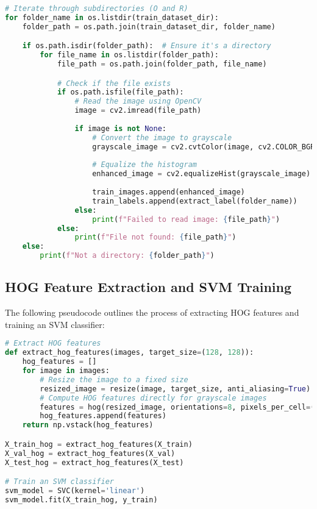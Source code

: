 \documentclass{article}
\begin{document}
\begin{lstlisting}[language=Python, caption=Data Loading and Processing Pseudocode]
# Iterate through subdirectories (O and R)
for folder_name in os.listdir(train_dataset_dir):
    folder_path = os.path.join(train_dataset_dir, folder_name)

    if os.path.isdir(folder_path):  # Ensure it's a directory
        for file_name in os.listdir(folder_path):
            file_path = os.path.join(folder_path, file_name)

            # Check if the file exists
            if os.path.isfile(file_path):
                # Read the image using OpenCV
                image = cv2.imread(file_path)
                
                if image is not None:
                    # Convert the image to grayscale
                    grayscale_image = cv2.cvtColor(image, cv2.COLOR_BGR2GRAY)
                    
                    # Equalize the histogram
                    enhanced_image = cv2.equalizeHist(grayscale_image)
                    
                    train_images.append(enhanced_image)
                    train_labels.append(extract_label(folder_name))
                else:
                    print(f"Failed to read image: {file_path}")
            else:
                print(f"File not found: {file_path}")
    else:
        print(f"Not a directory: {folder_path}")
\end{lstlisting}

\subsection{HOG Feature Extraction and SVM Training}
The following pseudocode outlines the process of extracting HOG features and training an SVM classifier:

\begin{lstlisting}[language=Python, caption=HOG Feature Extraction and SVM Training Pseudocode]
# Extract HOG features
def extract_hog_features(images, target_size=(128, 128)):
    hog_features = []
    for image in images:
        # Resize the image to a fixed size
        resized_image = resize(image, target_size, anti_aliasing=True)
        # Compute HOG features directly for grayscale images
        features = hog(resized_image, orientations=8, pixels_per_cell=(8, 8), cells_per_block=(1, 1), block_norm='L2-Hys', visualize=False, feature_vector=True)
        hog_features.append(features)
    return np.vstack(hog_features)

X_train_hog = extract_hog_features(X_train)
X_val_hog = extract_hog_features(X_val)
X_test_hog = extract_hog_features(X_test)

# Train an SVM classifier
svm_model = SVC(kernel='linear')
svm_model.fit(X_train_hog, y_train)
\end{lstlisting}
\end{document}
